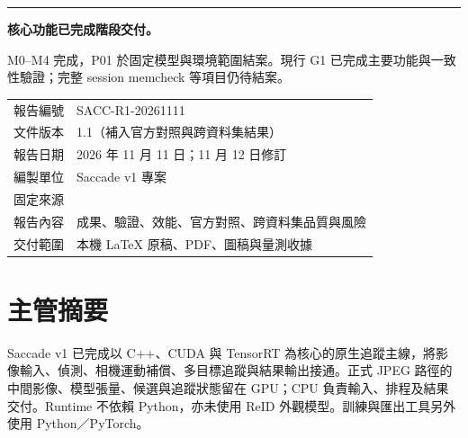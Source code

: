 \documentclass[UTF8,11pt,a4paper,fontset=none]{ctexart}
\begin{document}
\hypersetup{pageanchor=false}
\begin{titlepage}
\thispagestyle{empty}
\noindent\textcolor{teal}{\rule{\textwidth}{2.2pt}}
\vspace{17mm}
\par
\vspace{8mm}
\par
\vspace{5mm}
\par
\vspace{8mm}
\par
\vspace{16mm}
\begin{finding}
\large\textbf{核心功能已完成階段交付。}\par
\normalsize M0–M4 完成，P01 於固定模型與環境範圍結案。現行 G1 已完成主要功能與一致性驗證；完整 session memcheck 等項目仍待結案。
\end{finding}
\vfill
\noindent\begin{tabularx}{\textwidth}{@{}P{28mm}Y@{}}
\toprule
報告編號 & SACC-R1-20261111 \\
文件版本 & 1.1（補入官方對照與跨資料集結果） \\
報告日期 & 2026 年 11 月 11 日；11 月 12 日修訂 \\
編製單位 & Saccade v1 專案 \\
固定來源 & \small{} \\
報告內容 & 成果、驗證、效能、官方對照、跨資料集品質與風險 \\
交付範圍 & 本機 LaTeX 原稿、PDF、圖稿與量測收據 \\
\bottomrule
\end{tabularx}\par
\vspace{5mm}
\end{titlepage}

\hypersetup{pageanchor=true}
\section*{主管摘要}
Saccade v1 已完成以 C++、CUDA 與 TensorRT 為核心的原生追蹤主線，將影像輸入、偵測、相機運動補償、多目標追蹤與結果輸出接通。正式 JPEG 路徑的中間影像、模型張量、候選與追蹤狀態留在 GPU；CPU 負責輸入、排程及結果交付。Runtime 不依賴 Python，亦未使用 ReID 外觀模型。訓練與匯出工具另外使用 Python／PyTorch。
\end{document}
